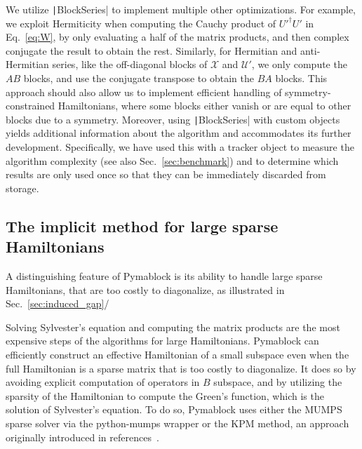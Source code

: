 We utilize \texttt|BlockSeries| to implement multiple other optimizations.
For example, we exploit Hermiticity when computing the Cauchy product of $U'^{\dagger}U'$ in Eq.~\eqref{eq:W}, by only evaluating a half of the matrix products, and then complex conjugate the result to obtain the rest.
Similarly, for Hermitian and anti-Hermitian series, like the off-diagonal blocks of $\mathcal{X}$ and $\mathcal{U}'$, we only compute the $AB$ blocks, and use the conjugate transpose to obtain the $BA$ blocks.
This approach should also allow us to implement efficient handling of symmetry-constrained Hamiltonians, where some blocks either vanish or are equal to other blocks due to a symmetry.
Moreover, using \texttt|BlockSeries| with custom objects yields additional information about the algorithm and accommodates its further development.
Specifically, we have used this with a tracker object to measure the algorithm complexity (see also Sec.~\ref{sec:benchmark}) and to determine which results are only used once so that they can be immediately discarded from storage.

\subsection{The implicit method for large sparse Hamiltonians}
\label{sec:implicit}

A distinguishing feature of Pymablock is its ability to handle large sparse Hamiltonians, that are too costly to diagonalize, as illustrated in Sec.~\ref{sec:induced_gap}/

Solving Sylvester's equation and computing the matrix products are the most expensive steps of the algorithms for large Hamiltonians.
Pymablock can efficiently construct an effective Hamiltonian of a small subspace even when the full Hamiltonian is a sparse matrix that is too costly to diagonalize.
It does so by avoiding explicit computation of operators in $B$ subspace, and by utilizing the sparsity of the Hamiltonian to compute the Green's function, which is the solution of Sylvester's equation.
To do so, Pymablock uses either the MUMPS sparse solver via the python-mumps wrapper or the KPM method, an approach originally introduced in references~\cite{Weisse_2006, Irfan_2019}.


